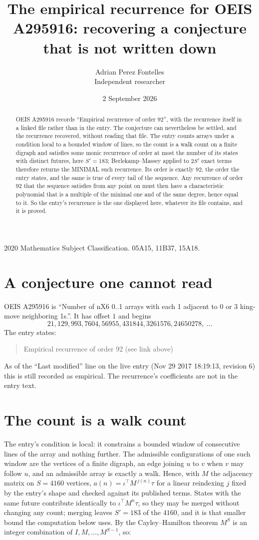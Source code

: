 \documentclass[11pt,a4paper]{article}
\title{The empirical recurrence for OEIS A295916: recovering a conjecture that is not written down}
\author{Adrian Perez Fontelles\\ \small Independent researcher}
\date{2 September 2026}
\theoremstyle{plain}
\theoremstyle{definition}
\begin{document}
\maketitle

\begin{abstract}
OEIS A295916 records ``Empirical recurrence of order $92$'', with the recurrence itself in a
linked file rather than in the entry. The conjecture can nevertheless be settled, and the
recurrence recovered, without reading that file. The entry counts arrays under a condition
local to a bounded window of lines, so the count is a walk count on a finite digraph and
satisfies some monic recurrence of order at most the number of its states with distinct
futures, here $S'=183$; Berlekamp--Massey applied to $2S'$ exact
terms therefore returns the MINIMAL such recurrence. Its order is exactly $92$, the order
the entry states, and the same is true of every tail of the sequence. Any recurrence of order
$92$ that the sequence satisfies from any point on must then have a characteristic
polynomial that is a multiple of the minimal one and of the same degree, hence equal to it. So
the entry's recurrence is the one displayed here, whatever its file contains, and it is
proved.
\end{abstract}

\noindent\small 2020 Mathematics Subject Classification. 05A15, 11B37, 15A18.\normalsize

\section{A conjecture one cannot read}

OEIS A295916 is ``Number of nX6 0..1 arrays with each 1 adjacent to 0 or 3 king-move neighboring 1s.''. It has offset $1$ and begins
\[
21, 129, 993, 7604, 56955, 431844, 3261576, 24650278,\ \dots
\]
The entry states:
\begin{quote}
Empirical recurrence of order 92 (see link above)
\end{quote}
As of the ``Last modified'' line on the live entry (Nov 29 2017 18:19:13, revision 6) this is still
recorded as empirical. The recurrence's coefficients are not in the entry text.

\section{The count is a walk count}

The entry's condition is local: it constrains a bounded window of consecutive lines of the
array and nothing further. The admissible configurations of one such window are the vertices
of a finite digraph, an edge joining $u$ to $v$ when $v$ may follow $u$, and an admissible
array is exactly a walk. Hence, with $M$ the adjacency matrix on $S=4160$ vertices,
$a(n)=\iota^{\!\top}M^{\,j(n)}\tau$ for a linear reindexing $j$ fixed by the entry's shape
and checked against its published terms. States with the same future contribute identically to $\iota^{\!\top}M^n\tau$, so they may be merged without changing any count; merging leaves $S'=183$ of the $4160$, and it is that smaller bound the computation below uses. By the Cayley--Hamilton theorem $M^{S}$ is an
integer combination of $I,M,\dots,M^{S-1}$, so:
\end{document}
